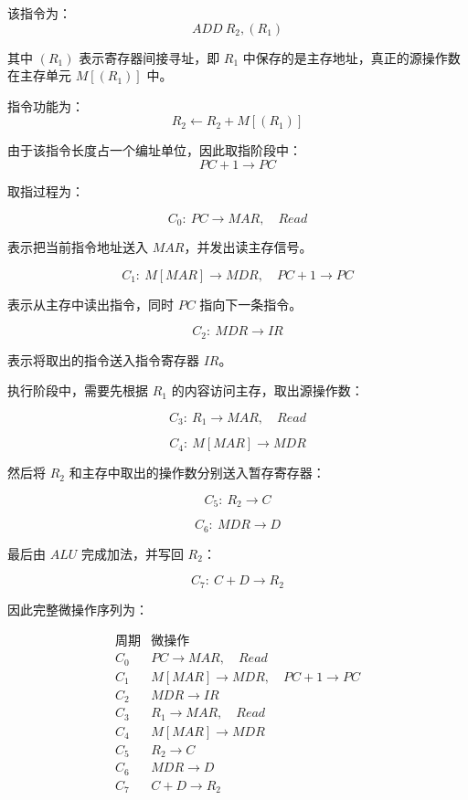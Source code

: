 \begin{analysisenv}
该指令为：
\[
ADD\ R_2,(R_1)
\]

其中 $(R_1)$ 表示寄存器间接寻址，即 $R_1$ 中保存的是主存地址，真正的源操作数在主存单元 $M[(R_1)]$ 中。

指令功能为：
\[
R_2 \leftarrow R_2 + M[(R_1)]
\]

由于该指令长度占一个编址单位，因此取指阶段中：
\[
PC+1 \rightarrow PC
\]

取指过程为：

\[
C_0:\ PC \rightarrow MAR,\quad Read
\]

表示把当前指令地址送入 $MAR$，并发出读主存信号。

\[
C_1:\ M[MAR] \rightarrow MDR,\quad PC+1 \rightarrow PC
\]

表示从主存中读出指令，同时 $PC$ 指向下一条指令。

\[
C_2:\ MDR \rightarrow IR
\]

表示将取出的指令送入指令寄存器 $IR$。

执行阶段中，需要先根据 $R_1$ 的内容访问主存，取出源操作数：

\[
C_3:\ R_1 \rightarrow MAR,\quad Read
\]

\[
C_4:\ M[MAR] \rightarrow MDR
\]

然后将 $R_2$ 和主存中取出的操作数分别送入暂存寄存器：

\[
C_5:\ R_2 \rightarrow C
\]

\[
C_6:\ MDR \rightarrow D
\]

最后由 $ALU$ 完成加法，并写回 $R_2$：

\[
C_7:\ C+D \rightarrow R_2
\]

因此完整微操作序列为：

\[
\begin{array}{c|l}
\text{周期} & \text{微操作} \\
\hline
C_0 & PC \rightarrow MAR,\quad Read \\
C_1 & M[MAR] \rightarrow MDR,\quad PC+1 \rightarrow PC \\
C_2 & MDR \rightarrow IR \\
C_3 & R_1 \rightarrow MAR,\quad Read \\
C_4 & M[MAR] \rightarrow MDR \\
C_5 & R_2 \rightarrow C \\
C_6 & MDR \rightarrow D \\
C_7 & C+D \rightarrow R_2
\end{array}
\]
\end{analysisenv}



